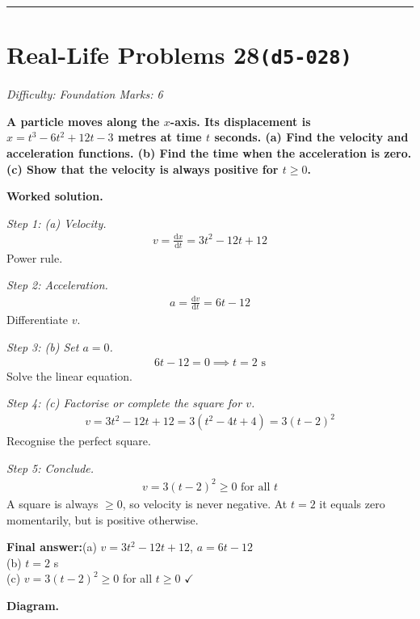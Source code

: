 \documentclass[11pt]{article}
\newcommand{\question}[1]{\par\medskip\noindent\textbf{#1}\par}
\begin{document}
\medskip\hrule

\section*{Real-Life Problems 28\quad\small\texttt{(d5-028)}}
\textit{Difficulty: Foundation \quad\textbar\quad Marks: 6}

\question{A particle moves along the \( x \)-axis. Its displacement is \( x = t^3 - 6t^2 + 12t - 3 \) metres at time \( t \) seconds. (a) Find the velocity and acceleration functions. (b) Find the time when the acceleration is zero. (c) Show that the velocity is always positive for \( t \geq 0 \).}

\textbf{Worked solution.}

\textit{Step 1: (a) Velocity.}
\[\begin{gathered}
v = \frac{\mathrm{d}x}{\mathrm{d}t} = 3t^2 - 12t + 12
\end{gathered}\]
Power rule.

\textit{Step 2: Acceleration.}
\[\begin{gathered}
a = \frac{\mathrm{d}v}{\mathrm{d}t} = 6t - 12
\end{gathered}\]
Differentiate \( v \).

\textit{Step 3: (b) Set \( a = 0 \).}
\[\begin{gathered}
6t - 12 = 0 \implies t = 2 \text{ s}
\end{gathered}\]
Solve the linear equation.

\textit{Step 4: (c) Factorise or complete the square for \( v \).}
\[\begin{gathered}
v = 3t^2 - 12t + 12 = 3(t^2 - 4t + 4) = 3(t - 2)^2
\end{gathered}\]
Recognise the perfect square.

\textit{Step 5: Conclude.}
\[\begin{gathered}
v = 3(t-2)^2 \geq 0 \text{ for all } t
\end{gathered}\]
A square is always \( \geq 0 \), so velocity is never negative. At \( t = 2 \) it equals zero momentarily, but is positive otherwise.

\begin{answerbox}
\textbf{Final answer:}\quad (a) \(\displaystyle  v = 3t^2-12t+12 \), \(\displaystyle  a = 6t-12 \) \\[3pt]  (b) \(\displaystyle  t = 2 \) s \\[3pt]  (c) \(\displaystyle  v = 3(t-2)^2 \geq 0 \) for all \(\displaystyle  t \geq 0 \) $\checkmark$
\end{answerbox}
\textbf{Diagram.}
\end{document}
